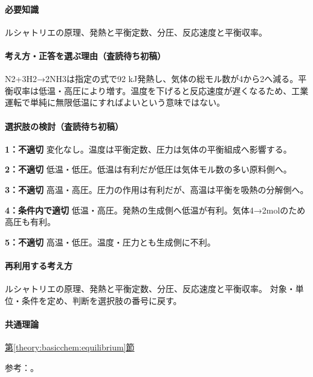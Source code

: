 \paragraph{必要知識} ルシャトリエの原理、発熱と平衡定数、分圧、反応速度と平衡収率。

\paragraph{考え方・正答を選ぶ理由（査読待ち初稿）} N2+3H2→2NH3は指定の式で92 kJ発熱し、気体の総モル数が4から2へ減る。平衡収率は低温・高圧により増す。温度を下げると反応速度が遅くなるため、工業運転で単純に無限低温にすればよいという意味ではない。

\paragraph{選択肢の検討（査読待ち初稿）}\mbox{}\par

\noindent\textbf{1：不適切} 変化なし。温度は平衡定数、圧力は気体の平衡組成へ影響する。\par

\noindent\textbf{2：不適切} 低温・低圧。低温は有利だが低圧は気体モル数の多い原料側へ。\par

\noindent\textbf{3：不適切} 高温・高圧。圧力の作用は有利だが、高温は平衡を吸熱の分解側へ。\par

\noindent\textbf{4：条件内で適切} 低温・高圧。発熱の生成側へ低温が有利。気体4→2molのため高圧も有利。\par

\noindent\textbf{5：不適切} 高温・低圧。温度・圧力とも生成側に不利。\par

\paragraph{再利用する考え方} ルシャトリエの原理、発熱と平衡定数、分圧、反応速度と平衡収率。 対象・単位・条件を定め、判断を選択肢の番号に戻す。

\paragraph{共通理論} \hyperref[theory:basicchem:equilibrium]{第\ref*{theory:basicchem:equilibrium}節}

\par 参考：\cite{chem55_equilibrium}。

